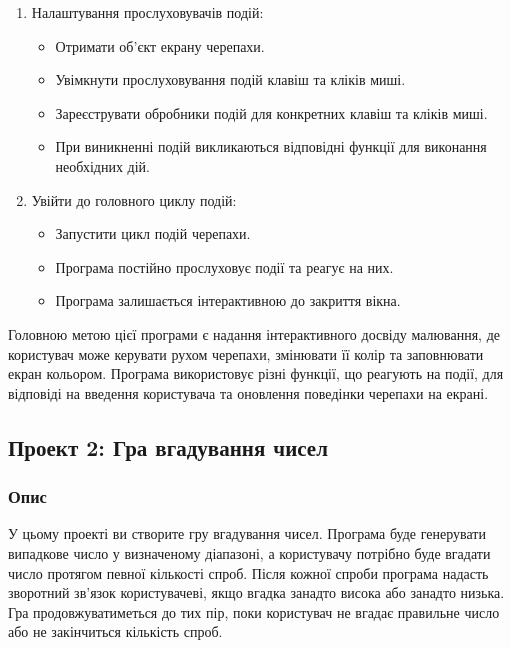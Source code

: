 \documentclass[12pt]{article}
\begin{document}
\begin{enumerate}[label=\arabic*.]
\item Налаштування прослуховувачів подій:
\begin{itemize}
\item Отримати об'єкт екрану черепахи.
\item Увімкнути прослуховування подій клавіш та кліків миші.
\item Зареєструвати обробники подій для конкретних клавіш та кліків миші.
\item При виникненні подій викликаються відповідні функції для виконання необхідних дій.
\end{itemize}

\item Увійти до головного циклу подій:
\begin{itemize}
\item Запустити цикл подій черепахи.
\item Програма постійно прослуховує події та реагує на них.
\item Програма залишається інтерактивною до закриття вікна.
\end{itemize}
\end{enumerate}

Головною метою цієї програми є надання інтерактивного досвіду малювання, де користувач може керувати рухом черепахи, змінювати її колір та заповнювати екран кольором. Програма використовує різні функції, що реагують на події, для відповіді на введення користувача та оновлення поведінки черепахи на екрані.
\newpage

\subsection{Проект 2: Гра вгадування чисел}

\subsubsection{Опис}
У цьому проекті ви створите гру вгадування чисел. Програма буде генерувати випадкове число у визначеному діапазоні, а користувачу потрібно буде вгадати число протягом певної кількості спроб. Після кожної спроби програма надасть зворотний зв'язок користувачеві, якщо вгадка занадто висока або занадто низька. Гра продовжуватиметься до тих пір, поки користувач не вгадає правильне число або не закінчиться кількість спроб.
\end{document}
